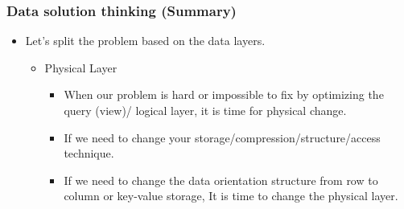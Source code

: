 \begin{frame}
  \frametitle{Data solution thinking (Summary) }
  \begin{itemize}[<+->]
  \item Let's split the problem based on the data layers.
    \begin{itemize}[<+->]
    \item Physical Layer
      \begin{itemize}[<+->]
      \item When our problem is hard or impossible to fix by optimizing the query (view)/ logical layer, it is time for physical change.
      \item If we need to change your storage/compression/structure/access technique.
      \item If we need to change the data orientation structure from row to column or key-value storage, It is time to change the physical layer.
      \end{itemize}
    \end{itemize}
  \end{itemize}
 \end{frame}